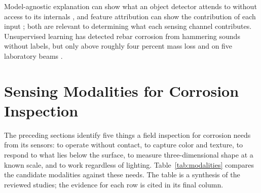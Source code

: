 Model-agnostic explanation can show what an object detector attends to without
access to its internals \citep{Moradi2024}, and feature attribution can show the contribution
of each input \citep{Persiya2025}; both are relevant to determining what each sensing channel
contributes. Unsupervised learning has detected rebar corrosion from hammering
sounds without labels, but only above roughly four percent mass loss and on five
laboratory beams \citep{Phannakham2026}.

\section{Sensing Modalities for Corrosion Inspection}
\label{sec:lr-modalities}

The preceding sections identify five things a field inspection for corrosion
needs from its sensors: to operate without contact, to capture color and
texture, to respond to what lies below the surface, to measure three-dimensional
shape at a known scale, and to work regardless of lighting.
Table~\ref{tab:modalities} compares the candidate modalities against these needs.
The table is a synthesis of the reviewed studies; the evidence for each row is
cited in its final column.

